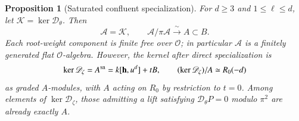 \documentclass[10pt,fleqn]{article}
\numberwithin{equation}{section}
\newtheorem{proposition}[theorem]{Proposition}
\begin{document}
\begin{proposition}[Saturated confluent specialization]
\label{v8r8:mixed:confluence}
For $d\ge3$ and $1\le\ell\le d$, let
$\mathscr K=\ker\mathscr D_\theta$.  Then
\[
 \mathscr A=\mathscr K,\qquad
 \mathscr A/\pi\mathscr A\xrightarrow{\ \sim\ }A\subset B.
\]
Each root-weight component is finite free over $\mathscr O$; in
particular $\mathscr A$ is a finitely generated flat $\mathscr O$-algebra.
However, the kernel after direct specialization is
\[
 \ker\mathscr D_\zeta=A^{\rm sn}=k[\mathbf h,u^d]+tB,
 \qquad (\ker\mathscr D_\zeta)/A\simeq R_0(-d)
\]
as graded $A$-modules, with $A$ acting on $R_0$ by restriction to $t=0$.
Among elements of
$\ker\mathscr D_\zeta$, those admitting a lift satisfying
$\mathscr D_\theta P=0$ modulo $\pi^2$ are already exactly $A$.
\end{proposition}
\end{document}
